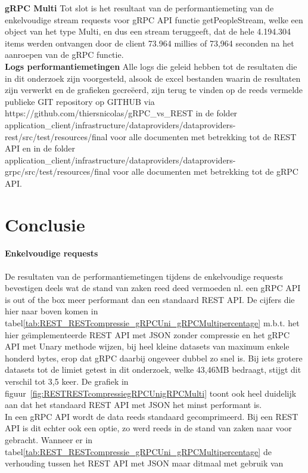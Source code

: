 \textbf{gRPC Multi}\newline
Tot slot is het resultaat van de performantiemeting van de enkelvoudige stream requests voor gRPC API functie getPeopleStream,
welke een object van het type Multi, en dus een stream teruggeeft, dat de hele 4.194.304 items werden ontvangen door de client 73.964 millies of 73,964 seconden
na het aanroepen van de gRPC functie.\\

\textbf{Logs performantiemetingen}\newline
Alle logs die geleid hebben tot de resultaten die in dit onderzoek zijn voorgesteld, alsook de excel bestanden waarin de resultaten zijn verwerkt en de grafieken gecre\"eerd,
zijn terug te vinden op de reeds vermelde publieke GIT repository op GITHUB via https://github.com/thiersnicolas/gRPC\_vs\_REST in de folder
application\_client/infrastructure/dataproviders/dataproviders-rest/src/test/resources/final voor alle documenten met betrekking tot de REST API en in de folder
application\_client/infrastructure/dataproviders/dataproviders-grpc/src/test/resources/final voor alle documenten met betrekking tot de gRPC API.\\

\section{Conclusie}

\paragraph{Enkelvoudige requests}
De resultaten van de performantiemetingen tijdens de enkelvoudige requests bevestigen deels wat de stand van zaken reed deed vermoeden nl. een gRPC API is out of the box
meer performant dan een standaard REST API. De cijfers die hier naar boven komen in tabel\ref{tab:REST_RESTcompressie_gRPCUni_gRPCMultipercentage} m.b.t.
het hier ge\"{\i}mplementeerde REST API met JSON zonder compressie en het gRPC API met Unary methode wijzen, bij heel kleine datasets van maximum enkele honderd bytes, erop dat gRPC
daarbij ongeveer dubbel zo snel is. Bij iets grotere datasets tot de limiet getest in dit onderzoek, welke 43,46MB bedraagt, stijgt dit verschil tot 3,5 keer.
De grafiek in figuur~\ref{fig:RESTRESTcompressiegRPCUnigRPCMulti} toont ook heel duidelijk aan dat het standaard REST API met JSON het minst performant is.\\
In een gRPC API wordt de data reeds standaard gecomprimeerd. Bij een REST API is dit echter ook een optie, zo werd reeds in de stand van zaken naar voor gebracht. Wanneer er
in tabel\ref{tab:REST_RESTcompressie_gRPCUni_gRPCMultipercentage} de verhouding tussen het REST API met JSON maar ditmaal met gebruik van


